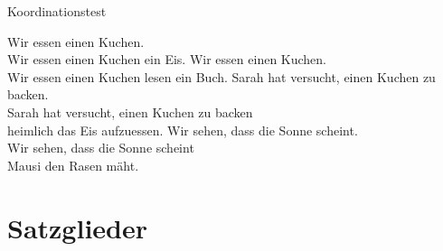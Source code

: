 \begin{frame}
  {Koordinationstest}
  \pause
  \begin{exe}
    \ex\label{ex:konstituententests041}
    \begin{xlist}
      \ex Wir essen \alert<3->{einen Kuchen}.\\
      \pause
         Wir essen \alert{einen Kuchen}  \alert{ein Eis}.
      \pause
      \ex Wir \alert<5->{essen einen Kuchen}.\\
      \pause
         Wir \alert{essen einen Kuchen}  \alert{lesen ein Buch}.
      \pause
      \ex Sarah hat versucht, \alert<7->{einen Kuchen zu backen}.\\
      \pause
         Sarah hat versucht, \alert{einen Kuchen zu backen}  \\{}\alert{heimlich das Eis aufzuessen}.
      \pause
      \ex Wir sehen, dass \alert<9->{die Sonne scheint}.\\
      \pause
         Wir sehen, dass \alert{die Sonne scheint}  \\{}\alert{Mausi den Rasen mäht}.
    \end{xlist}
  \end{exe}
  \pause
  \begin{exe}
    \end{exe}
\end{frame}



\section{Satzglieder}

